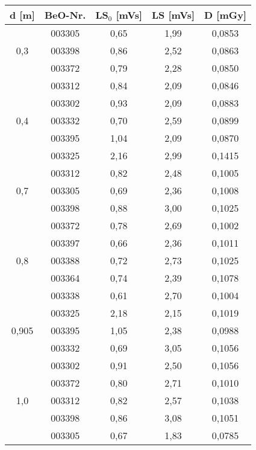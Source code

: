 	\begin{center}	
		\begin{tabular}{c|c|c|c|c}
					\textbf{d} [m] & BeO-Nr. & \textbf{LS$_0$} [mVs] & \textbf{LS} [mVs] & \textbf{D} [mGy] \\
			\hline  
								& 003305 & 0,65 & 1,99 & 0,0853\\
						0,3		& 003398 & 0,86 & 2,52 & 0,0863\\
								& 003372 & 0,79 & 2,28 & 0,0850\\
								& 003312 & 0,84 & 2,09 & 0,0846\\
			\hline  
								& 003302 & 0,93 & 2,09 & 0,0883\\
						0,4		& 003332 & 0,70 & 2,59 & 0,0899\\
								& 003395 & 1,04 & 2,09 & 0,0870\\
								& 003325 & 2,16 & 2,99 & 0,1415\\
			\hline  
								& 003312 & 0,82 & 2,48 & 0,1005\\
						0,7		& 003305 & 0,69 & 2,36 & 0,1008\\
								& 003398 & 0,88 & 3,00 & 0,1025\\
								& 003372 & 0,78 & 2,69 & 0,1002\\
			\hline  
								& 003397 & 0,66 & 2,36 & 0,1011\\
						0,8		& 003388 & 0,72 & 2,73 & 0,1025\\
								& 003364 & 0,74 & 2,39 & 0,1078\\
								& 003338 & 0,61 & 2,70 & 0,1004\\
			\hline  
								& 003325 & 2,18 & 2,15 & 0,1019\\
						0,905   & 003395 & 1,05 & 2,38 & 0,0988\\
								& 003332 & 0,69 & 3,05 & 0,1056\\
								& 003302 & 0,91 & 2,50 & 0,1056\\
			\hline  
								& 003372 & 0,80 & 2,71 & 0,1010\\
						1,0		& 003312 & 0,82 & 2,57 & 0,1038\\
								& 003398 & 0,86 & 3,08 & 0,1051\\
								& 003305 & 0,67 & 1,83 & 0,0785\\
								
		\end{tabular}
	\end{center}

